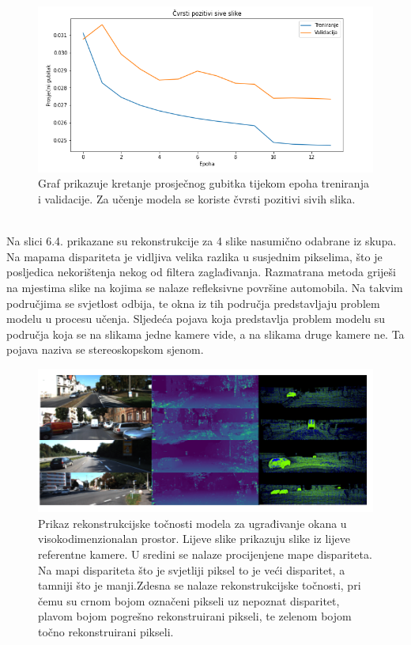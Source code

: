 \documentclass[times, utf8, zavrsni, numeric]{fer}
\begin{document}
\begin{figure}[htb]
\centering
\includegraphics[scale = 0.74]{img/val.png}
\caption{Graf prikazuje kretanje prosječnog gubitka tijekom epoha treniranja i validacije. Za učenje modela se koriste čvrsti pozitivi sivih slika.}
\label{fig:KITTI}
\end{figure}
\pagebreak\\
Na slici 6.4. prikazane su rekonstrukcije za 4 slike nasumično odabrane iz skupa. Na mapama dispariteta je vidljiva velika razlika u susjednim pikselima, što je posljedica nekorištenja nekog od filtera zaglađivanja.  Razmatrana metoda griješi na mjestima slike na kojima se nalaze refleksivne površine automobila. Na takvim područjima se svjetlost odbija, te okna iz tih područja predstavljaju problem modelu u procesu učenja. Sljedeća pojava koja predstavlja problem modelu su područja koja se na slikama jedne kamere vide, a na slikama druge kamere ne. Ta pojava naziva se stereoskopskom sjenom.\cite{ilinovic}

\begin{figure}[htb]
\centering
\includegraphics[scale = 0.43]{img/eval.png}
\caption{Prikaz rekonstrukcijske točnosti modela za ugrađivanje okana u visokodimenzionalan prostor. Lijeve slike prikazuju slike iz lijeve referentne kamere. U sredini se nalaze procijenjene mape dispariteta. Na mapi dispariteta što je svjetliji piksel to je veći disparitet, a tamniji što je manji.Zdesna se nalaze rekonstrukcijske točnosti, pri čemu su crnom bojom označeni pikseli uz nepoznat disparitet, plavom bojom pogrešno rekonstruirani pikseli, te zelenom bojom točno rekonstruirani pikseli.}
\label{fig:KITTI}
\end{figure}
\end{document}
